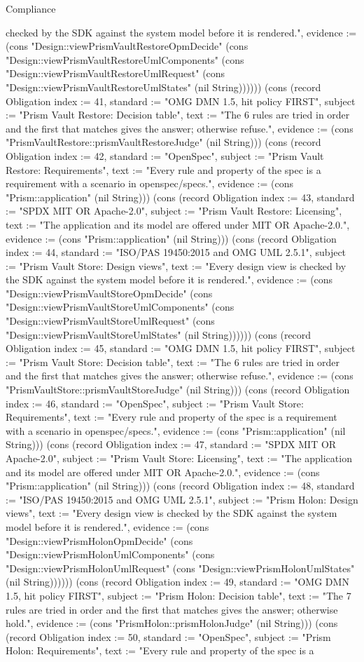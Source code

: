 \begin{lexlean}{Compliance}
\begin{semanticmodule}
{checked by the SDK against the system model before it is rendered.", evidence := (cons "Design::viewPrismVaultRestoreOpmDecide" (cons "Design::viewPrismVaultRestoreUmlComponents" (cons "Design::viewPrismVaultRestoreUmlRequest" (cons "Design::viewPrismVaultRestoreUmlStates" (nil String)))))}) (cons (record Obligation {index := 41, standard := "OMG DMN 1.5, hit policy FIRST", subject := "Prism Vault Restore: Decision table", text := "The 6 rules are tried in order and the first that matches gives the answer; otherwise refuse.", evidence := (cons "PrismVaultRestore::prismVaultRestoreJudge" (nil String))}) (cons (record Obligation {index := 42, standard := "OpenSpec", subject := "Prism Vault Restore: Requirements", text := "Every rule and property of the spec is a requirement with a scenario in openspec/specs.", evidence := (cons "Prism::application" (nil String))}) (cons (record Obligation {index := 43, standard := "SPDX MIT OR Apache-2.0", subject := "Prism Vault Restore: Licensing", text := "The application and its model are offered under MIT OR Apache-2.0.", evidence := (cons "Prism::application" (nil String))}) (cons (record Obligation {index := 44, standard := "ISO/PAS 19450:2015 and OMG UML 2.5.1", subject := "Prism Vault Store: Design views", text := "Every design view is checked by the SDK against the system model before it is rendered.", evidence := (cons "Design::viewPrismVaultStoreOpmDecide" (cons "Design::viewPrismVaultStoreUmlComponents" (cons "Design::viewPrismVaultStoreUmlRequest" (cons "Design::viewPrismVaultStoreUmlStates" (nil String)))))}) (cons (record Obligation {index := 45, standard := "OMG DMN 1.5, hit policy FIRST", subject := "Prism Vault Store: Decision table", text := "The 6 rules are tried in order and the first that matches gives the answer; otherwise refuse.", evidence := (cons "PrismVaultStore::prismVaultStoreJudge" (nil String))}) (cons (record Obligation {index := 46, standard := "OpenSpec", subject := "Prism Vault Store: Requirements", text := "Every rule and property of the spec is a requirement with a scenario in openspec/specs.", evidence := (cons "Prism::application" (nil String))}) (cons (record Obligation {index := 47, standard := "SPDX MIT OR Apache-2.0", subject := "Prism Vault Store: Licensing", text := "The application and its model are offered under MIT OR Apache-2.0.", evidence := (cons "Prism::application" (nil String))}) (cons (record Obligation {index := 48, standard := "ISO/PAS 19450:2015 and OMG UML 2.5.1", subject := "Prism Holon: Design views", text := "Every design view is checked by the SDK against the system model before it is rendered.", evidence := (cons "Design::viewPrismHolonOpmDecide" (cons "Design::viewPrismHolonUmlComponents" (cons "Design::viewPrismHolonUmlRequest" (cons "Design::viewPrismHolonUmlStates" (nil String)))))}) (cons (record Obligation {index := 49, standard := "OMG DMN 1.5, hit policy FIRST", subject := "Prism Holon: Decision table", text := "The 7 rules are tried in order and the first that matches gives the answer; otherwise hold.", evidence := (cons "PrismHolon::prismHolonJudge" (nil String))}) (cons (record Obligation {index := 50, standard := "OpenSpec", subject := "Prism Holon: Requirements", text := "Every rule and property of the spec is a }
\end{semanticmodule}
\end{lexlean}
